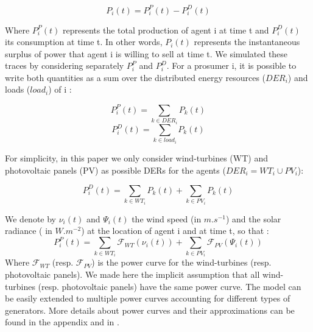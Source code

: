 \documentclass[journal]{IEEEtran}
\begin{document}
\begin{equation}
P_{i}(t) = P_{i}^{P}(t) - P_{i}^{D}(t)
\end{equation}

Where $ P_{i}^{P}(t) $ represents the total production of agent i at time t and $ P_{i}^{D}(t) $ its consumption at time t. In other words, $ P_{i}(t) $ represents the instantaneous surplus of power that agent i is willing to sell at time t. We simulated these traces by considering separately $ P_{i}^{P} $ and $ P_{i}^{D} $. For a prosumer i, it is possible to write both quantities as a sum over the distributed energy resources ($ DER_{i} $) and loads ($ load_{i} $) of i : 

\begin{equation}
P_{i}^{P}(t) = \sum_{k \in DER_{i}} P_{k}(t)
\end{equation}
\begin{equation}
P_{i}^{D}(t) = \sum_{k \in load_{i}} P_{k}(t)
\end{equation}

For simplicity, in this paper we only consider wind-turbines (WT) and photovoltaic panels (PV) as possible DERs for the agents ($ DER_{i} = WT_{i} \cup PV_{i} $):  

\begin{equation}
P_{i}^{D}(t) = \sum_{k \in WT_{i}} P_{k}(t) + \sum_{k \in PV_{i}} P_{k}(t)
\end{equation} 

We denote by $ \nu_{i}(t) $ and $ \Psi_{i}(t) $ the wind speed (in $ m.s^{-1} $) and the solar radiance ( in $ W.m^{-2} $) at the location of agent i and at time t, so that :
\begin{equation}
 P_{i}^{P}(t) = \sum_{k \in WT_{i}} \mathcal{F}_{WT}( \nu_{i}(t) ) + \sum_{k \in PV_{i} } \mathcal{F}_{PV}(\Psi_{i}(t) ) 
\end{equation}
Where $ \mathcal{F}_{WT} $ (resp. $ \mathcal{F}_{PV} $) is the power curve for the wind-turbines (resp. photovoltaic panels). We made here the implicit assumption that all wind-turbines (resp. photovoltaic panels) have the same power curve. The model can be easily extended to multiple power curves accounting for different types of generators. More details about power curves and their approximations can be found in the appendix and in \cite{Lydia2014}.
\end{document}
